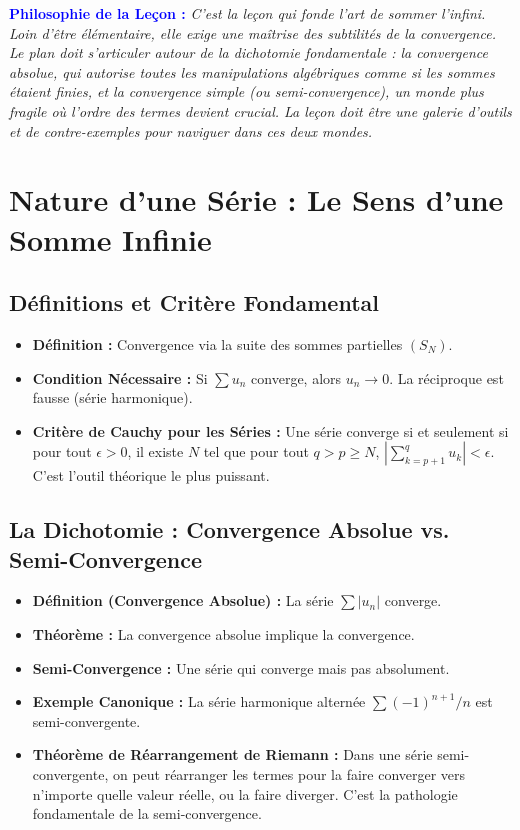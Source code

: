\documentclass[12pt, a4paper, parskip=full]{report}
\theoremstyle{agregstyle}
\newenvironment{philosophie}
  {\par\medskip\noindent\begin{oframed}\noindent\textbf{\textcolor{blue}{Philosophie de la Leçon :}}\itshape}
  {\end{oframed}\par\medskip}
\begin{document}
\begin{philosophie}
    C'est la leçon qui fonde l'art de sommer l'infini. Loin d'être élémentaire, elle exige une maîtrise des subtilités de la convergence. Le plan doit s'articuler autour de la dichotomie fondamentale : la convergence absolue, qui autorise toutes les manipulations algébriques comme si les sommes étaient finies, et la convergence simple (ou semi-convergence), un monde plus fragile où l'ordre des termes devient crucial. La leçon doit être une galerie d'outils et de contre-exemples pour naviguer dans ces deux mondes.
\end{philosophie}

\section{Nature d'une Série : Le Sens d'une Somme Infinie}
\subsection{Définitions et Critère Fondamental}
\begin{itemize}
    \item \textbf{Définition :} Convergence via la suite des sommes partielles $(S_N)$.
    \item \textbf{Condition Nécessaire :} Si $\sum u_n$ converge, alors $u_n \to 0$. La réciproque est fausse (série harmonique).
    \item \textbf{Critère de Cauchy pour les Séries :} Une série converge si et seulement si pour tout $\epsilon > 0$, il existe $N$ tel que pour tout $q > p \ge N$, $|\sum_{k=p+1}^q u_k| < \epsilon$. C'est l'outil théorique le plus puissant.
\end{itemize}
\subsection{La Dichotomie : Convergence Absolue vs. Semi-Convergence}
\begin{itemize}
    \item \textbf{Définition (Convergence Absolue) :} La série $\sum |u_n|$ converge.
    \item \textbf{Théorème :} La convergence absolue implique la convergence.
    \item \textbf{Semi-Convergence :} Une série qui converge mais pas absolument.
    \item \textbf{Exemple Canonique :} La série harmonique alternée $\sum (-1)^{n+1}/n$ est semi-convergente.
    \item \textbf{Théorème de Réarrangement de Riemann :} Dans une série semi-convergente, on peut réarranger les termes pour la faire converger vers n'importe quelle valeur réelle, ou la faire diverger. C'est la pathologie fondamentale de la semi-convergence.
\end{itemize}
\end{document}
